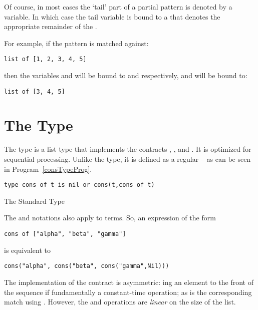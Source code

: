 \begin{aside}
Of course, in most cases the `tail' part of a partial  pattern is denoted by a variable. In which case the tail variable is bound to a  that denotes the appropriate remainder of the .

For example, if the pattern  is matched against:
\begin{lstlisting}
list of [1, 2, 3, 4, 5]
\end{lstlisting}
then the variables  and  will be bound to  and  respectively, and  will be bound to:
\begin{lstlisting}
list of [3, 4, 5]
\end{lstlisting}
\end{aside}

\section{The  Type}
\label{consType}
The  type is a list type that implements the contracts , ,  and . It is optimized for sequential processing. Unlike the  type, it is defined as a regular  -- as can be seen in Program~\vref{consTypeProg}.

\begin{program}[H]
\begin{lstlisting}
type cons of t is nil or cons(t,cons of t)
\end{lstlisting}
\caption{The Standard  Type}\label{consTypeProg}
\end{program}

The  and  notations also apply to  terms. So, an expression of the form
\begin{lstlisting}
cons of ["alpha", "beta", "gamma"]
\end{lstlisting}
is equivalent to 
\begin{lstlisting}
cons("alpha", cons("beta", cons("gamma",Nil)))
\end{lstlisting}

\begin{aside}
The  implementation of the  contract is asymmetric: ing an element to the front of the  sequence if fundamentally a constant-time operation; as is the corresponding match using . However, the  and  operations are \emph{linear} on the size of the  list.
\end{aside}

